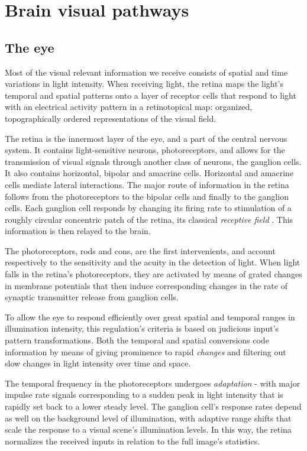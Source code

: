 \section{Brain visual pathways}
\label{sec:sectionb}

\subsection{The eye}

Most of the visual relevant information we receive consists of spatial and time variations in light intensity. When receiving light, the retina maps the light's temporal and spatial patterns onto a layer of receptor cells that respond to light with an electrical activity pattern in a retinotopical map: organized, topographically ordered representations of the visual field.  

The retina is the innermost layer of the eye, and a part of the central nervous system. It contains light-sensitive neurons, photoreceptors, and allows for the transmission of visual signals through another class of neurons, the ganglion cells. It also contains horizontal, bipolar and amacrine cells. Horizontal and amacrine cells mediate lateral interactions. The major route of information in the retina follows from the photoreceptors to the bipolar cells and finally to the ganglion cells. Each ganglion cell responds by changing its firing rate to stimulation of a roughly circular concentric patch of the retina, its classical \textit{receptive field} \cite{Kuffler1953}. This information is then relayed to the brain.

The photoreceptors, rods and cons, are the first intervenients, and account respectively to the sensitivity and the acuity in the detection of light.
When light falls in the retina's photoreceptors, they are activated by means of grated changes in membrane potentials that then induce corresponding changes in the rate of synaptic transmitter release from ganglion cells. 

To allow the eye to respond efficiently over great spatial and temporal ranges in illumination intensity, this regulation's criteria is based on judicious input's pattern transformations. Both the temporal and spatial conversions code information by means of giving prominence to rapid \textit{changes} and filtering out slow changes in light intensity over time and space.

The temporal frequency in the photoreceptors undergoes \textit{adaptation} - with major impulse rate signals corresponding to a sudden peak in light intensity that is rapidly set back to a lower steady level. The ganglion cell's response rates depend as well on the background level of illumination, with adaptive range shifts that scale the response to a visual scene's illumination levels. In this way, the retina normalizes the received inputs in relation to the full image's statistics. 

